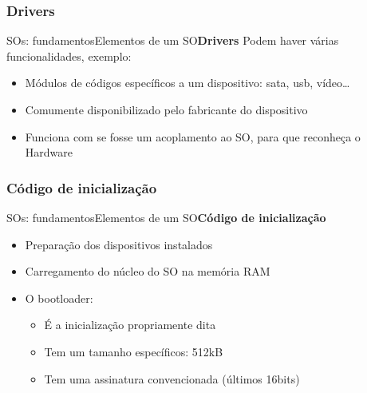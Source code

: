 \documentclass{beamer}
\begin{document}
      \subsubsection{Drivers}

        \begin{frame}{SOs: fundamentos}{Elementos de um SO}{\bfseries{Drivers}}
          \newline Podem haver várias funcionalidades, exemplo:
          \begin{itemize}
            \item Módulos de códigos específicos a um dispositivo: sata, usb, vídeo\dots
            \item Comumente disponibilizado pelo fabricante do dispositivo 
            \item Funciona com se fosse um acoplamento ao SO, para que reconheça o Hardware
          \end{itemize}
        \end{frame}

      \subsubsection{Código de inicialização}
        
        \begin{frame}{SOs: fundamentos}{Elementos de um SO}{\bfseries{Código de inicialização}}
          \begin{itemize}
            \item Preparação dos dispositivos instalados
            \item Carregamento do núcleo do SO na memória RAM
            \item O bootloader:
            \begin{itemize}
              \item É a inicialização propriamente dita
              \item Tem um tamanho específicos: 512kB
              \item Tem uma assinatura convencionada (últimos 16bits)          
            \end{itemize} 
          \end{itemize}
        \end{frame}
\end{document}
